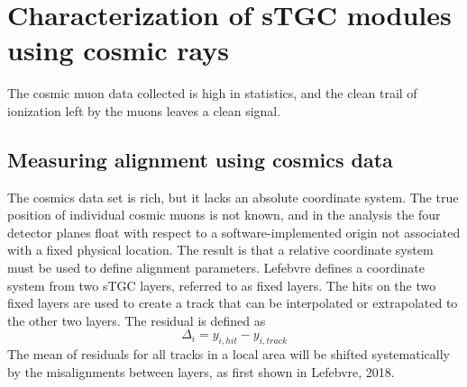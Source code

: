 
\chapter{Characterization of sTGC modules using cosmic rays}

The cosmic muon data collected is high in statistics, and the clean trail of ionization left by the muons leaves a clean signal.

\section{Measuring alignment using cosmics data}
The cosmics data set is rich, but it lacks an absolute coordinate system. The true position of individual cosmic muons is not known, and in the analysis the four detector planes float with respect to a software-implemented origin  not associated with a fixed physical location. The result is that a relative coordinate system must be used to define alignment parameters. Lefebvre defines a coordinate system from two sTGC layers, referred to as fixed layers\cite{lefebvre_thesis}. The hits on the two fixed layers are used to create a track that can be interpolated or extrapolated to the other two layers. The residual is defined as 
\begin{equation}
    \Delta_i = y_{i,hit} - y_{i,track}
\end{equation}
The mean of residuals for all tracks in a local area will be shifted systematically by the misalignments between layers, as first shown in Lefebvre, 2018\cite{lefebvre_thesis}. 

